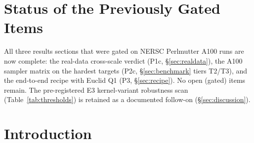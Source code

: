 \documentclass[11pt,letterpaper]{article}
\newcommand{\gammaEPL}{\ensuremath{\gamma}}
\newcommand{\Rhat}{\ensuremath{\hat{R}}}
\newcommand{\flowmc}{\textsc{flowMC}}
\begin{document}
\begin{abstract}
budget parity; parallel-tempered HMC is the most reliable until-converged; and
\flowmc\ fails structurally on these geometries. On the real system, the
correlated likelihood proves {\it necessary but not sufficient}. It flips the
binned bimodality verdict: per-basin evidence swings by $\sim$$191$~nats, from
favouring the steep basin ($\Delta\log Z=+162$ under the diagonal likelihood)
to favouring the low basin ($\Delta\log Z=-29$ under the correlated
likelihood), showing the upsampled steep basin to be a noise-covariance
artifact (hypothesis H1 confirmed). But it {\it over-corrects} the slope value:
the restored low-basin $\gammaEPL=1.103\pm0.008$ sits $\sim$$17\sigma$ {\it
below} the diagonal-native anchor $1.433$, and the correlated slopes across
scales {\it bracket} that anchor ($1.816$ fine-steep above, $1.103$ binned-low
below) rather than unifying onto it --- a residual scale dependence pointing to
further systematics in the source model and PSF (H2 rejected). On the inference
axis, the A100 phase shows the two hardest real posteriors defeat off-the-shelf
samplers: the $46$-dimensional condition-$10^{14}$ marginalized posterior
converges under neither single-stage HMC ($\Rhat=3.1$) nor auto-mass MCLMC
($\Rhat=5.9$), only under the campaign's own two-stage re-preconditioning
recipe; and on the $74$-dimensional bimodal posterior every direct sampler
fails mode recovery, so only per-basin SMC evidence yields a trustworthy mode
weight. Every quantitative claim is traced to a JSON artifact and a gate record
in \texttt{CAMPAIGN.md}.
\end{abstract}

\section*{Status of the Previously Gated Items}
\noindent All three results sections that were gated on NERSC Perlmutter A100
runs are now complete: the real-data cross-scale verdict (P1c,
\S\ref{sec:realdata}), the A100 sampler matrix on the hardest targets (P2c,
\S\ref{sec:benchmark} tiers T2/T3), and the end-to-end recipe with Euclid Q1
(P3, \S\ref{sec:recipe}). No open (gated) items remain. The pre-registered E3
kernel-variant robustness scan (Table~\ref{tab:thresholds}) is retained as a
documented follow-on (\S\ref{sec:discussion}).
\medskip

\section{Introduction}
\label{sec:intro}
\end{document}
